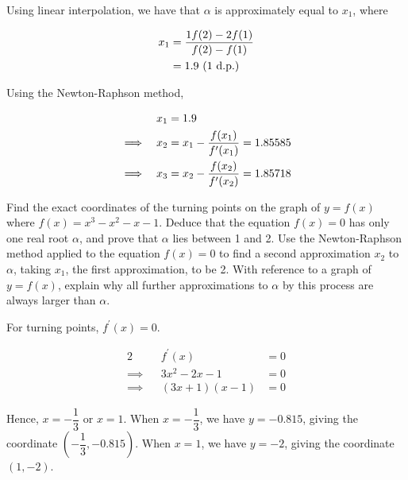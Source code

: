 \documentclass{echw}
\begin{document}

            Using linear interpolation, we have that $\alpha$ is approximately equal to $x_1$, where

            \begin{equation*}
                \begin{aligned}
                    x_1 &= \dfrac{1f(2) - 2f(1)}{f(2) - f(1)} \\
                    &= 1.9 \text{ (1 d.p.)}
                \end{aligned}
            \end{equation*}


            Using the Newton-Raphson method, 

            \begin{alignat*}{2}
                && x_1 &= 1.9 \\
                \implies&&x_2 &= x_1 - \dfrac{f(x_1)}{f^\prime(x_1)} = 1.85585 \\
                \implies&&x_3 &= x_2 - \dfrac{f(x_2)}{f^\prime(x_2)} = 1.85718
            \end{alignat*}


    \problem{}
        Find the exact coordinates of the turning points on the graph of $y = f(x)$ where $f(x) = x^3-x^2-x-1$. Deduce that the equation $f(x) = 0$ has only one real root $\alpha$, and prove that $\alpha$ lies between 1 and 2. Use the Newton-Raphson method applied to the equation $f(x) = 0$ to find a second approximation $x_2$ to $\alpha$, taking $x_1$, the first approximation, to be 2. With reference to a graph of $y=f(x)$, explain why all further approximations to $\alpha$ by this process are always larger than $\alpha$.

    \solution
        For turning points, $f^\prime(x) = 0$.

        \begin{alignat*}{2}
            &&f^\prime(x) &= 0 \\
            \implies&& 3x^2-2x-1 &= 0\\
            \implies&& (3x+1)(x-1) &= 0
        \end{alignat*}

        Hence, $x = -\dfrac13$ or $x = 1$. When $x = -\dfrac13$, we have $y = -0.815$, giving the coordinate $(-\dfrac13, -0.815)$. When $x = 1$, we have $y = -2$, giving the coordinate $(1, -2)$.
\end{document}
